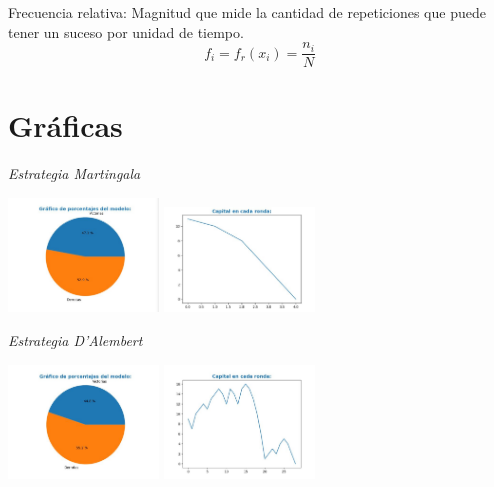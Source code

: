 \documentclass{article}
\begin{document}
    Frecuencia relativa: Magnitud que mide la cantidad de repeticiones que puede tener un suceso por unidad de tiempo.
    \begin{equation}
        f_{i} = f_{r}(x_{i}) = \frac {n_{i}}{N}
    \end{equation}

    \section{Gráficas}
    
    \vspace{1cm}

    {\itshape\Large Estrategia Martingala \par}

    \includegraphics[width=0.3\textwidth]{mg1.JPG}
    \includegraphics[width=0.3\textwidth]{mg2.JPG}

    \vspace{1cm}

    {\itshape\Large Estrategia D’Alembert \par}

    \includegraphics[width=0.3\textwidth]{dalem1.JPG}
    \includegraphics[width=0.3\textwidth]{dalem2.JPG}
\end{document}
